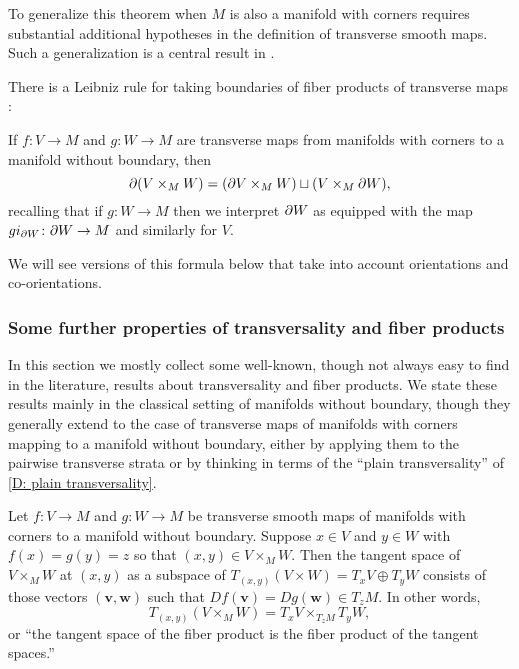 To generalize this theorem when $M$ is also a manifold with corners requires substantial additional hypotheses in the definition of transverse smooth maps.
Such a generalization is a central result in \cite{Joy12}.

There is a Leibniz rule for taking boundaries of fiber products of transverse maps \cite[Proposition~6.7]{Joy12}:

\begin{proposition}\label{P: product boundary}
	If $f \colon V \to M$ and $g \colon W \to M$ are transverse maps from manifolds with corners to a manifold without boundary, then
	\begin{equation*}
		\partial(V \times_M W) = (\partial V \times_M W) \sqcup (V \times_M \partial W),
	\end{equation*}
	recalling that if $g \colon W \to M$ then we interpret $\partial W$ as equipped with the map $gi_{\partial W} \colon \partial W \to M$ and similarly for $V$.
\end{proposition}



We will see versions of this formula below that take into account orientations and co-orientations.

\subsubsection{Some further properties of transversality and fiber products}

In this section we mostly collect some well-known, though not always easy to find in the literature, results about transversality and fiber products.
We state these results mainly in the classical setting of manifolds without boundary, though they generally extend to the case of transverse maps of manifolds with corners mapping to a manifold without boundary, either by applying them to the pairwise transverse strata or by thinking in terms of the ``plain transversality'' of \cref{D: plain transversality}.

\begin{lemma}\label{L: tangent of pullbacks}
	Let $f \colon V \to M$ and $g \colon W \to M$ be transverse smooth maps of manifolds with corners to a manifold without boundary.
	Suppose $x \in V$ and $y \in W$ with $f(x) = g(y) = z$ so that $(x,y) \in V \times_MW$.
	Then the tangent space of $V \times_MW$ at $(x,y)$ as a subspace of $T_{(x,y)}(V \times W) = T_xV \oplus T_yW$ consists of those vectors $(\mathbf v,\mathbf w)$ such that $Df(\mathbf v) = Dg(\mathbf w) \in T_zM$.
	In other words,
	$$T_{(x,y)}(V \times_M W) = T_xV \times_{T_zM} T_yW,$$
	or ``the tangent space of the fiber product is the fiber product of the tangent spaces.''
\end{lemma}

